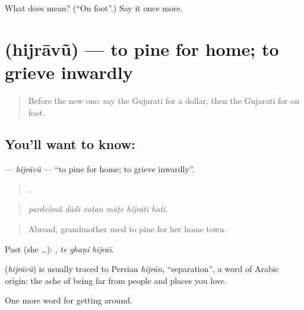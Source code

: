 \begin{tcolorbox}[breakable,colback=teal!4,colframe=teal!35!black,title={Before you move on}]
What does  mean? (\textquotedblleft{}On foot\textquotedblright{}.) Say it once more.
\end{tcolorbox}
\section[\texorpdfstring{\gu{હિજરાવું} (hijrāvũ)}{હિજરાવું (hijrāvũ)}]{ (hijrāvũ) — to pine for home; to grieve inwardly}

\label{lesson:GU-C407-hijravu}



\begin{quote}
Before the new one: say the Gujarati for a dollar, then the Gujarati for on foot.
\end{quote}

\subsection*{You'll want to know: }
\textbf{} — \emph{hijrāvũ} — \textquotedblleft{}to pine for home; to grieve inwardly\textquotedblright{}.

\begin{quote}
     .
\end{quote}

\begin{quote}
\emph{pardeśmā̃ dādī vatan māṭe hijrātī hatī.}
\end{quote}

\begin{quote}
Abroad, grandmother used to pine for her home town.
\end{quote}

Past (she …):   , \emph{te ghaṇī hijrāī}.

\begin{cousinweb}
\textbf{} (\emph{hijrāvũ}) is usually traced to Persian \emph{hijrān}, \textquotedblleft{}separation\textquotedblright{}, a word of Arabic origin: the ache of being far from people and places you love.
\end{cousinweb}

\begin{grammarlens}[title={What you've built}]
One more word for getting around.
\end{grammarlens}

